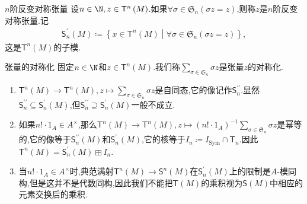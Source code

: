 \begin{definition}{$n$阶反变对称张量}{}
	设$n\in\N,z\in\mathsf{T}^{n}\left(M\right)$.如果$\forall\sigma\in\mathfrak{S}_{n}\left(\sigma z=z\right)$,则称$z$是$n$阶反变对称张量.记
	\begin{align*}
		\mathsf{S}_{n}^{\prime}\left(M\right)\coloneq\left\{x\in\mathsf{T}^{n}\left(M\right)\middle|\forall\sigma\in\mathfrak{S}_{n}\left(\sigma z=z\right)\right\},
	\end{align*}
	这是$\mathsf{T}^{n}\left(M\right)$的子模.
\end{definition}

\begin{definition}{张量的对称化}{}
	固定$n\in\N$和$z\in\mathsf{T}^{n}\left(M\right)$.我们称$\sum\limits_{\sigma\in\mathfrak{S}_{n}}\sigma z$是张量$z$的对称化.
\end{definition}

\begin{remark}{}{}
	\begin{enumerate}
		\item $\mathsf{T}^{n}\left(M\right)\to\mathsf{T}^{n}\left(M\right),z\mapsto\sum\limits_{\sigma\in\mathfrak{S}_{n}}\sigma z$是自同态,它的像记作$\mathsf{S}_{n}^{\prime\prime}$.显然$\mathsf{S}_{n}^{\prime\prime}\subseteq\mathsf{S}_{n}^{\prime}\left(M\right)$,但$\mathsf{S}_{n}^{\prime\prime}\supseteq\mathsf{S}_{n}^{\prime}\left(M\right)$一般不成立.
		\item 如果$n!\cdot 1_{A}\in A^{\times}$,那么$\mathsf{T}^{n}\left(M\right)\to\mathsf{T}^{n}\left(M\right),z\mapsto\left(n!\cdot 1_{A}\right)^{-1}\sum\limits_{\sigma\in\mathfrak{S}_{n}}\sigma z$是幂等的,它的像等于$\mathsf{S}_{n}^{\prime\prime}\left(M\right)$和$\mathsf{S}_{n}^{\prime}\left(M\right)$,它的核等于$I_{n}\coloneq I_{\text{Sym}}\cap\mathsf{T}_{n}$.因此$\mathsf{T}^{n}\left(M\right)=\mathsf{S}_{n}^{\prime}\left(M\right)\boxplus I_{n}$.
		\item 当$n!\cdot 1_{A}\in A^{\times}$时,典范满射$\mathsf{T}^{n}\left(M\right)\to\mathsf{S}^{n}\left(M\right)$在$\mathsf{S}_{n}^{\prime}\left(M\right)$上的限制是$A$-模同构,但是这并不是代数同构,因此我们不能把$\mathsf{T}\left(M\right)$的乘积视为$\mathsf{S}\left(M\right)$中相应的元素交换后的乘积.
	\end{enumerate}
\end{remark}



























